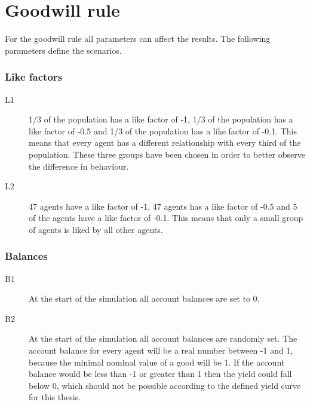 \documentclass[twoside,openright]{uva-bachelor-thesis}
\begin{document}
\section{Goodwill rule}
For the goodwill rule all parameters can affect the results. The following parameters define the scenarios.
\subsubsection{Like factors}
\begin{description}
\item[L1]	1/3 of the population has a like factor of -1, 1/3 of the population has a like factor of -0.5 and 1/3 of the population has a like factor of -0.1. This means that every agent has a different relationship with every third of the population. These three groups have been chosen in order to better observe the difference in behaviour.
\item[L2]	47 agents have a like factor of -1, 47 agents has a like factor of -0.5 and 5 of the agents have a like factor of -0.1. This means that only a small group of agents is liked by all other agents.
\end{description}
\subsubsection{Balances}
\begin{description}
\item[B1]	At the start of the simulation all account balances are set to 0.
\item[B2]	At the start of the simulation all account balances are randomly set. The account balance for every agent will be a real number between -1 and 1, because the minimal nominal value of a good will be 1. If the account balance would be less than -1 or greater than 1 then the yield could fall below 0, which should not be possible according to the defined yield curve for this thesis.
\end{description}
\end{document}
